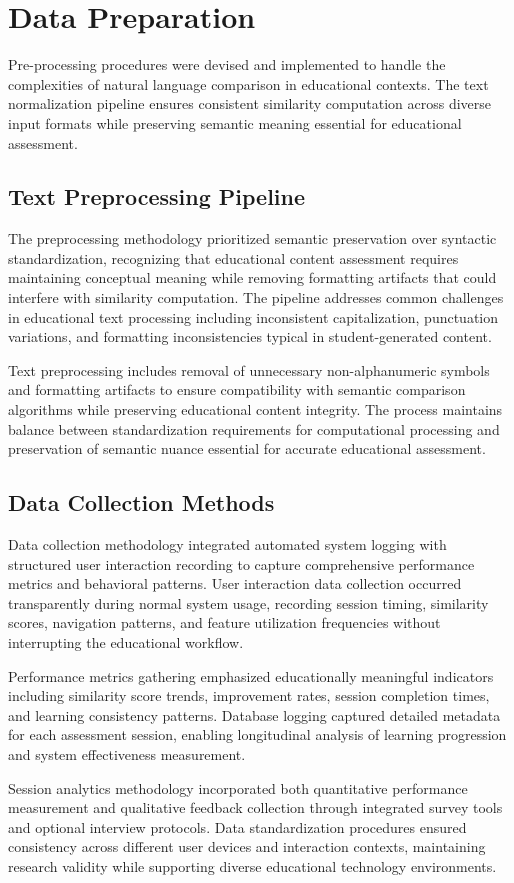 {\color{maroon}
\section{Data Preparation}
\label{sec:data_preparation}

Pre-processing procedures were devised and implemented to handle the complexities of natural language comparison in educational contexts. The text normalization pipeline ensures consistent similarity computation across diverse input formats while preserving semantic meaning essential for educational assessment.

\subsection{Text Preprocessing Pipeline}

The preprocessing methodology prioritized semantic preservation over syntactic standardization, recognizing that educational content assessment requires maintaining conceptual meaning while removing formatting artifacts that could interfere with similarity computation. The pipeline addresses common challenges in educational text processing including inconsistent capitalization, punctuation variations, and formatting inconsistencies typical in student-generated content.

Text preprocessing includes removal of unnecessary non-alphanumeric symbols and formatting artifacts to ensure compatibility with semantic comparison algorithms while preserving educational content integrity. The process maintains balance between standardization requirements for computational processing and preservation of semantic nuance essential for accurate educational assessment.

\subsection{Data Collection Methods}

Data collection methodology integrated automated system logging with structured user interaction recording to capture comprehensive performance metrics and behavioral patterns. User interaction data collection occurred transparently during normal system usage, recording session timing, similarity scores, navigation patterns, and feature utilization frequencies without interrupting the educational workflow.

Performance metrics gathering emphasized educationally meaningful indicators including similarity score trends, improvement rates, session completion times, and learning consistency patterns. Database logging captured detailed metadata for each assessment session, enabling longitudinal analysis of learning progression and system effectiveness measurement.

Session analytics methodology incorporated both quantitative performance measurement and qualitative feedback collection through integrated survey tools and optional interview protocols. Data standardization procedures ensured consistency across different user devices and interaction contexts, maintaining research validity while supporting diverse educational technology environments.
}

